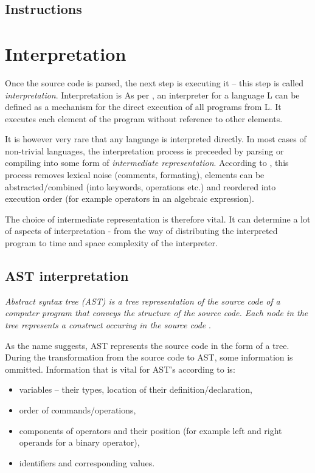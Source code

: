 \documentclass[thesis=M,english]{FITthesis}[2019/12/23]
\begin{document}
\subsection{Instructions}


\section{Interpretation}
Once the source code is parsed, the next step is executing it -- this step is called \textit{interpretation}. Interpretation is
As per \cite{wolczko-02-ast-interpret}, an interpreter for a language L can be defined as a mechanism for the direct execution of all programs
from L. It executes each element of the program without reference to other elements.

It is however very rare that any language is interpreted directly. In most cases of non-trivial languages, the interpretation process
is preceeded by parsing or compiling into some form of \textit{intermediate representation}. According to \cite{wolczko-02-ast-interpret},
this process removes lexical noise (comments, formating), elements can be abstracted/combined (into keywords, operations etc.) and reordered
into execution order (for example operators in an algebraic expression).

The choice of intermediate representation is therefore vital. It can determine a lot of aspects of interpretation - from the way of distributing
the interpreted program to time and space complexity of the interpreter.

\subsection{AST interpretation}
\textit{Abstract syntax tree (AST) is a tree representation of the source code of a computer program that conveys the structure of the source code.
Each node in the tree represents a construct occuring in the source code }\cite{deepsource-ast}.

As the name suggests, AST represents the source code in the form of a tree. During the transformation from the source code to AST, some information
is ommitted. Information that is vital for AST's according to \cite{deepsource-ast} is:
\begin{itemize}
	\item variables -- their types, location of their definition/declaration,
	\item order of commands/operations,
	\item components of operators and their position (for example left and right operands for a binary operator),
	\item identifiers and corresponding values.
\end{itemize}
\end{document}
